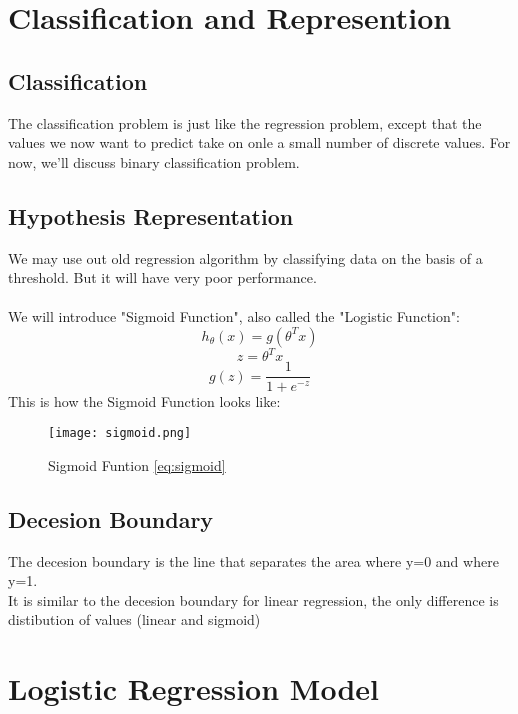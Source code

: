 \section{Classification and Represention}

  \subsection{Classification}
    The classification problem is just like the regression problem, except that the values we now want to predict take on onle a small number of discrete values. For now, we'll discuss binary classification problem.

  \subsection{Hypothesis Representation}
    We may use out old regression algorithm by classifying data on the basis of a threshold. But it will have very poor performance.\\ 
    \\We will introduce "Sigmoid Function", also called the "Logistic Function":
    \begin{equation}
      h_\theta(x) = g(\theta^{T}x)
    \end{equation}
    \begin{equation}
      z = \theta^{T}x
    \end{equation}
    \begin{equation}\label{eq:sigmoid}
      g(z) = \frac{1}{1+e^{-z}}
    \end{equation}
    This is how the Sigmoid Function looks like:
    \begin{figure}[h]
      \centering
      \texttt{[image: sigmoid.png]}
      \caption{Sigmoid Funtion \ref{eq:sigmoid}}
    \end{figure}

  \subsection{Decesion Boundary}
    The decesion boundary is the line that separates the area where y=0 and where y=1.\\
    It is similar to the decesion boundary for linear regression, the only difference is distibution of values (linear and sigmoid)

\section{Logistic Regression Model}

